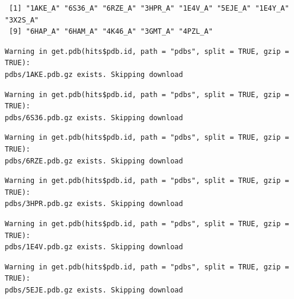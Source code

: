 \documentclass[
  letterpaper,
  DIV=11,
  numbers=noendperiod]{scrartcl}
\newenvironment{Shaded}{\begin{snugshade}}{\end{snugshade}}
\newcommand{\AttributeTok}[1]{\textcolor[rgb]{0.40,0.45,0.13}{#1}}
\newcommand{\ConstantTok}[1]{\textcolor[rgb]{0.56,0.35,0.01}{#1}}
\newcommand{\FunctionTok}[1]{\textcolor[rgb]{0.28,0.35,0.67}{#1}}
\newcommand{\NormalTok}[1]{\textcolor[rgb]{0.00,0.23,0.31}{#1}}
\newcommand{\OtherTok}[1]{\textcolor[rgb]{0.00,0.23,0.31}{#1}}
\newcommand{\SpecialCharTok}[1]{\textcolor[rgb]{0.37,0.37,0.37}{#1}}
\newcommand{\StringTok}[1]{\textcolor[rgb]{0.13,0.47,0.30}{#1}}
\begin{document}
\begin{Shaded}
\end{Shaded}

\begin{verbatim}
 [1] "1AKE_A" "6S36_A" "6RZE_A" "3HPR_A" "1E4V_A" "5EJE_A" "1E4Y_A" "3X2S_A"
 [9] "6HAP_A" "6HAM_A" "4K46_A" "3GMT_A" "4PZL_A"
\end{verbatim}

\begin{Shaded}
\end{Shaded}

\begin{verbatim}
Warning in get.pdb(hits$pdb.id, path = "pdbs", split = TRUE, gzip = TRUE):
pdbs/1AKE.pdb.gz exists. Skipping download
\end{verbatim}

\begin{verbatim}
Warning in get.pdb(hits$pdb.id, path = "pdbs", split = TRUE, gzip = TRUE):
pdbs/6S36.pdb.gz exists. Skipping download
\end{verbatim}

\begin{verbatim}
Warning in get.pdb(hits$pdb.id, path = "pdbs", split = TRUE, gzip = TRUE):
pdbs/6RZE.pdb.gz exists. Skipping download
\end{verbatim}

\begin{verbatim}
Warning in get.pdb(hits$pdb.id, path = "pdbs", split = TRUE, gzip = TRUE):
pdbs/3HPR.pdb.gz exists. Skipping download
\end{verbatim}

\begin{verbatim}
Warning in get.pdb(hits$pdb.id, path = "pdbs", split = TRUE, gzip = TRUE):
pdbs/1E4V.pdb.gz exists. Skipping download
\end{verbatim}

\begin{verbatim}
Warning in get.pdb(hits$pdb.id, path = "pdbs", split = TRUE, gzip = TRUE):
pdbs/5EJE.pdb.gz exists. Skipping download
\end{verbatim}
\end{document}
